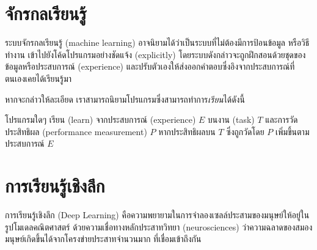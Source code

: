 \documentclass{cpereport}
\begin{document}
\section{จักรกลเรียนรู้}
ระบบจักรกลเรียนรู้ (machine learning) อาจนิยามได้ว่าเป็นระบบที่ไม่ต้องมีการป้อนข้อมูล หรือวิธีทำงาน เข้าไปยังโค้ดโปรแกรมอย่างชัดแจ้ง (explicitly) โดยระบบดังกล่าวจะถูกฝึกสอนด้วยชุดของข้อมูลหรือประสบการณ์ (experience) และปรับตัวเองให้ส่งออกคำตอบซึ่งอิงจากประสบการณ์ที่ตนเองเคยได้เรียนรู้มา

หากจะกล่าวให้ละเอียด เราสามารถนิยามโปรแกรมซึ่งสามารถทำการ\textit{เรียน}ได้ดังนี้ \cite{Mitchell97}

\begin{definition}
โปรแกรมใดๆ เรียน (learn) จากประสบการณ์ (experience) $E$ บนงาน (task) $T$ และการวัดประสิทธิผล (performance measurement) $P$ หากประสิทธิผลบน $T$ ซึ่งถูกวัดโดย $P$ เพิ่มขึ้นตามประสบการณ์ $E$
\end{definition}

\section{การเรียนรู้เชิงลึก}
การเรียนรู้เชิงลึก (Deep Learning) คือความพยายามในการจำลองเซลล์ประสามของมนุษย์ให้อยู่ในรูปโมเดลคณิตศาสตร์
ด้วยความเชื่อทางหลักประสาทวิทยา (neurosciences) ว่าความฉลาดของสมองมนุษย์เกิดขึ้นได้จากโครงข่ายประสาทจำนวนมาก
ที่เชื่อมเข้าถึงกัน \cite{Goodfellow-et-al-2016}
\end{document}
